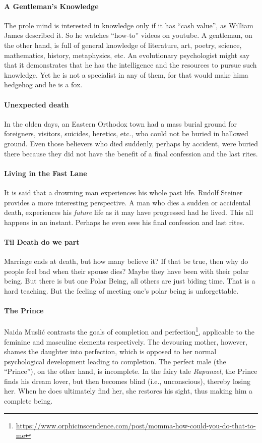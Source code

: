 \paragraph{A Gentleman's Knowledge} The prole mind is interested in knowledge only if it has ``cash value'', as William James described it. So he watches ``how-to'' videos on youtube. A gentleman, on the other hand, is full of general knowledge of literature, art, poetry, science, mathematics, history, metaphysics, etc. An evolutionary psychologist might say that it demonstrates that he has the intelligence and the resources to pursue such knowledge. Yet he is not a specialist in any of them, for that would make hima hedgehog and he is a fox.

\paragraph{Unexpected death} In the olden days, an Eastern Orthodox town had a mass burial ground for foreigners, visitors, suicides, heretics, etc., who could not be buried in hallowed ground. Even those believers who died suddenly, perhaps by accident, were buried there because they did not have the benefit of a final confession and the last rites.

\paragraph{Living in the Fast Lane} It is said that a drowning man experiences his whole past life. Rudolf Steiner provides a more interesting perspective. A man who dies a sudden or accidental death, experiences his \emph{future} life as it may have progressed had he lived. This all happens in an instant. Perhaps he even sees his final confession and last rites.

\paragraph{Til Death do we part} Marriage ends at death, but how many believe it? If that be true, then why do people feel bad when their spouse dies? Maybe they have been with their polar being. But there is but one Polar Being, all others are just biding time. That is a hard teaching. But the feeling of meeting one's polar being is unforgettable.

\paragraph{The Prince} Naida Muslić contrasts the goals of completion and perfection\footnote{\url{https://www.orphicinscendence.com/post/momma-how-could-you-do-that-to-me}}, applicable to the feminine and masculine elements respectively. The devouring mother, however, shames the daughter into perfection, which is opposed to her normal psychological development leading to completion. The perfect male (the ``Prince''), on the other hand, is incomplete. In the fairy tale \emph{Rapunzel}, the Prince finds his dream lover, but then becomes blind (i.e., unconscious), thereby losing her. When he does ultimately find her, she restores his sight, thus making him a complete being.

